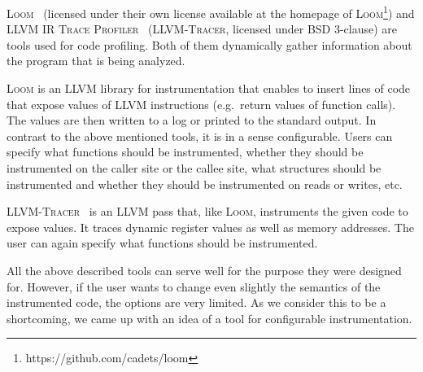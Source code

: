 \textsc{Loom}~\cite{loom} (licensed under their own license available at the
homepage of \textsc{Loom}\footnote{https://github.com/cadets/loom}) and
\textsc{LLVM IR Trace Profiler}~\cite{tracer} (\textsc{LLVM-Tracer}, licensed
under BSD 3-clause) are tools used for code profiling. Both of them dynamically
gather information about the program that is being analyzed.

\textsc{Loom} is an LLVM library for instrumentation that enables to insert
lines of code that expose values of LLVM instructions (e.g.~return values of
function calls). The values are then written to a log or printed to the
standard output. In contrast to the above mentioned tools, it is in a sense
configurable. Users can specify what functions should be instrumented, whether
they should be instrumented on the caller site or the callee site, what
structures should be instrumented and whether they should be instrumented on
reads or writes, etc.

\textsc{LLVM-Tracer}~\cite{tracer} is an LLVM pass that, like \textsc{Loom},
instruments the given code to expose values. It traces dynamic register values
as well as memory addresses. The user can again specify what functions should
be instrumented.

All the above described tools can serve well for the purpose they were designed
for. However, if the user wants to change even slightly the semantics of the
instrumented code, the options are very limited. As we consider this to be
a shortcoming, we came up with an idea of a tool for configurable
instrumentation.

